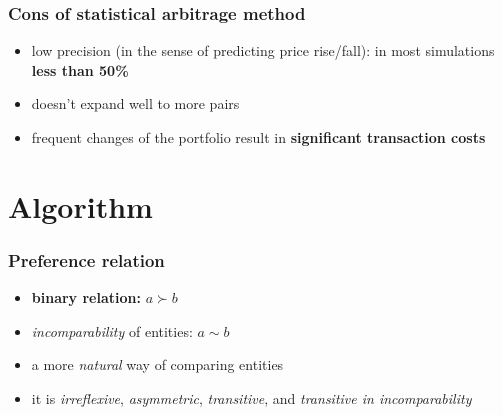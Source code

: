 \documentclass[11pt]{beamer}
\newcommand{\q}{\left}
\newcommand{\w}{\right}
\renewcommand{\alert}{\textbf}
\begin{document}

  \begin{frame}
    \frametitle{Cons of statistical arbitrage method}
    \begin{itemize}
      \item low precision (in the sense of predicting price rise/fall): in most simulations \textbf{less than 50\%}
      \item doesn't expand well to more pairs
      \item frequent changes of the portfolio result in \alert{significant transaction costs}
    \end{itemize}
  \end{frame}

  \section{Algorithm}
  \begin{frame}
    \frametitle{Preference relation}
    \begin{itemize}
      \item \textbf{binary relation:} $a \succ b$ %
      \item \emph{incomparability} of entities: $a \sim b$ %
      \item a more \emph{natural} way of comparing entities
      \item it is \emph{irreflexive}, \emph{asymmetric}, \emph{transitive}, and \emph{transitive in incomparability} 
    \end{itemize}
  \end{frame}
\end{document}
